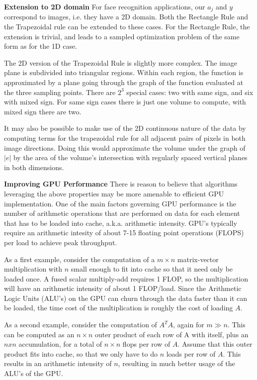 \documentclass[9.5pt,journal,final,finalsubmission,twocolumn]{IEEEtran}
\begin{document}

{\bf Extension to 2D domain} For face recognition applications, our $a_j$ and
$y$ correspond to images, i.e. they have a 2D domain.  Both the Rectangle Rule
and the Trapezoidal rule can be extended to these cases.  For the Rectangle
Rule, the extension is trivial, and leads to a sampled optimization problem of
the same form as for the 1D case.  

The 2D version of the Trapezoidal Rule is slightly more complex.  The image
plane is subdivided into triangular regions.  Within each region, the function
is approximated by a plane going through the graph of the function evaluated at
the three sampling points.  There are $2^3$ special cases: two with same sign,
and six with mixed sign.  For same sign cases there is just one volume to
compute, with mixed sign there are two.  

It may also be possible to make use of the 2D continuous nature of the data by
computing terms for the trapezoidal rule for all adjacent pairs of pixels in
both image directions.  Doing this would approximate the volume under the graph
of $|e|$ by the area of the volume's intersection with regularly spaced
vertical planes in both dimensions.  


{\bf Improving GPU Performance } There is reason to believe that algorithms
leveraging the above properties may be more amenable to efficient GPU
implementation.  One of the main factors governing GPU performance is the
number of arithmetic operations that are performed on data for each element
that has to be loaded into cache, a.k.a. arithmetic intensity.  GPU's typically
require an arithmetic intesity of about 7-15 floating point operations (FLOPS)
per load to achieve peak throughput.  

As a first example, consider the computation of a $m \times n$ matrix-vector
multiplication with $n$ small enough to fit into cache so that it need only be
loaded once.  A fused scalar multiply-add requires 1 FLOP, so the
multiplication will have an arithmetic intensity of about 1 FLOP/load.  Since
the Arithmetic Logic Units (ALU's) on the GPU can churn through the data faster
than it can be loaded, the time cost of the multiplication is roughly the cost
of loading $A$.  

As a second example, consider the computation of $A^T A$, again for $m \gg n$.
This can be computed as an $n \times n$ outer product of each row of A with
itself, plus an $n x n$ accumulation, for a total of $n \times n$ flops per row
of $A$.  Assume that this outer product fits into cache, so that we only have
to do $n$ loads per row of $A$.  This results in an arithmetic intensity of
$n$, resulting in much better usage of the ALU's of the GPU.
\end{document}
